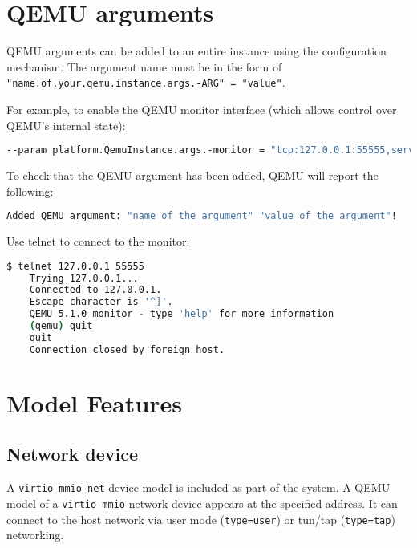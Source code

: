\clearpage
\section{QEMU arguments}

QEMU arguments can be added to an entire instance using the configuration mechanism. The argument name must be in the form of {\small{\lstinline!"name.of.your.qemu.instance.args.-ARG" = "value"!}}.

For example, to enable the QEMU monitor interface (which allows control over QEMU's internal state):

\small
\begin{lstlisting}[language=bash]
    --param platform.QemuInstance.args.-monitor = "tcp:127.0.0.1:55555,server,nowait"!
\end{lstlisting}
\normalsize

To check that the QEMU argument has been added, QEMU will report the following:

\small
\begin{lstlisting}[language=bash]
    Added QEMU argument: "name of the argument" "value of the argument"!
\end{lstlisting}
\normalsize

Use telnet to connect to the monitor:

\small
\begin{lstlisting}[language=bash]
    $ telnet 127.0.0.1 55555
    Trying 127.0.0.1...
    Connected to 127.0.0.1.
    Escape character is '^]'.
    QEMU 5.1.0 monitor - type 'help' for more information
    (qemu) quit
    quit
    Connection closed by foreign host.
\end{lstlisting}
\normalsize


\section{Model Features}

\subsection{Network device}

A {\small{\lstinline!virtio-mmio-net!}} device model is included as part of the system. A QEMU model of a {\small{\lstinline!virtio-mmio!}} network device appears at the specified address. It can connect to the host network via user mode ({\small{\lstinline!type=user!}}) or tun/tap ({\small{\lstinline!type=tap!}}) networking.

